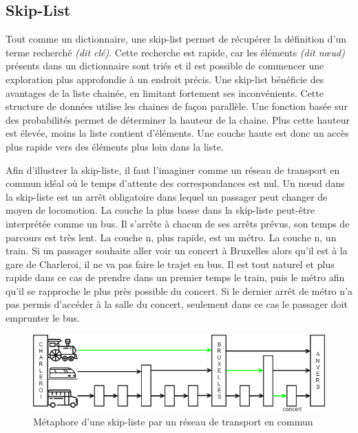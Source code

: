 \documentclass[hidelinks,a4paper, 12pt]{article}
\begin{document}
	\newpage
	\subsection{Skip-List}
	
	
	Tout comme un dictionnaire, une skip-list permet de récupérer la définition d'un terme recherché \textit{(dit clé)}. Cette recherche est rapide, car les éléments \textit{(dit nœud)} présents dans un dictionnaire sont triés et il est possible de commencer une exploration plus approfondie à un endroit précis.
	Une skip-list bénéficie des avantages de la liste chainée, en limitant fortement ses inconvénients. Cette structure de données utilise les chaines de façon parallèle. Une fonction basée sur des probabilités permet de déterminer la hauteur de la chaine. Plus cette hauteur est élevée, moins la liste contient d'éléments. Une couche haute est donc un accès plus rapide vers des éléments plus loin dans la liste.
	
	
	
	Afin d'illustrer la skip-liste, il faut l'imaginer comme un réseau de transport en commun idéal où le temps d'attente des correspondances est nul. Un nœud dans la skip-liste est un arrêt obligatoire dans lequel un passager peut changer de moyen de locomotion. La couche la plus basse dans la skip-liste peut-être interprétée comme un bus. Il s'arrête à chacun de ses arrêts prévus, son temps de parcours est très lent. La couche n, plus rapide, est un métro. La couche n, un train. Si un passager souhaite aller voir un concert à Bruxelles alors qu'il est à la gare de Charleroi, il ne va pas faire le trajet en bus. Il est tout naturel et plus rapide dans ce cas de prendre dans un premier temps le train, puis le métro afin qu'il se rapproche le plus près possible du concert. Si le dernier arrêt de métro n'a pas permis d'accéder à la salle du concert, seulement dans ce cas le passager doit emprunter le bus.
	
	\begin{figure}[h!]
		\includegraphics[width=\textwidth]{img/metaphore}
		\caption{Métaphore d'une skip-liste par un réseau de transport en commun}
		\label{skip-meta}
	\end{figure}
	
\end{document}
